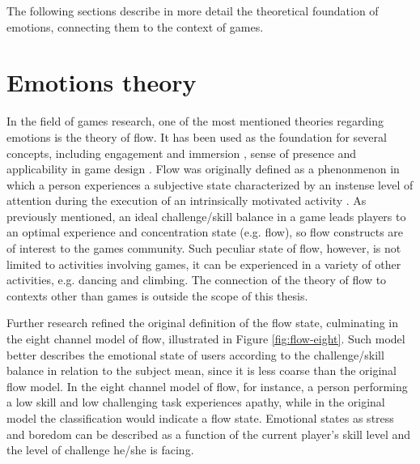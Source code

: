  The following sections describe in more detail the theoretical foundation of emotions, connecting them to the context of games.

\section{Emotions theory}

In the field of games research, one of the most mentioned theories regarding emotions is the theory of flow. It has been used as the foundation for several concepts, including engagement and immersion \parencite{brown2004grounded}, sense of presence \parencite{weibel2011immersion} and applicability in game design \parencite{sweetser2005gameflow, chen2007flow, cruz2017player}. Flow was originally defined as a phenonmenon in which a person experiences a subjective state characterized by an instense level of attention during the execution of an intrinsically motivated activity \parencite{csikszentmihalyi1991flow}. As previously mentioned, an ideal challenge/skill balance in a game leads players to an optimal experience and concentration state (e.g. flow), so flow constructs are of interest to the games community. Such peculiar state of flow, however, is not limited to activities involving games, it can be experienced in a variety of other activities, e.g. dancing and climbing. The connection of the theory of flow to contexts other than games is outside the scope of this thesis.

Further research \parencite{nakamura2014concept} refined the original definition of the flow state, culminating in the eight channel model of flow, illustrated in Figure \ref{fig:flow-eight}. Such model better describes the emotional state of users according to the challenge/skill balance in relation to the subject mean, since it is less coarse than the original flow model. In the eight channel model of flow, for instance, a person performing a low skill and low challenging task experiences apathy, while in the original model the classification would indicate a flow state. Emotional states as stress and boredom can be described as a function of the current player's skill level and the level of challenge he/she is facing.

